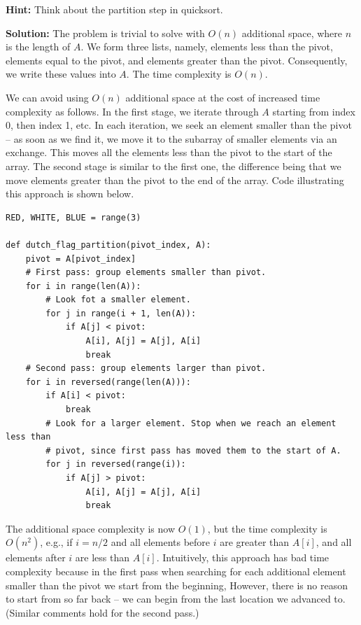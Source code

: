 \documentclass[11pt,a4paper]{article}
\begin{document}
\textbf{Hint:} Think about the partition step in quicksort.

\textbf{Solution:} The problem is trivial to solve with $O(n)$ additional
space, where $n$ is the length of $A$. We form three lists, namely, elements
less than the pivot, elements equal to the pivot, and elements greater than
the pivot. Consequently, we write these values into $A$. The time complexity
is $O(n)$.

We can avoid using $O(n)$ additional space at the cost of increased time
complexity as follows. In the first stage, we iterate through $A$ starting
from index 0, then index 1, etc. In each iteration, we seek an element smaller
than the pivot -- as soon as we find it, we move it to the subarray of smaller
elements via an exchange. This moves all the elements less than the pivot to
the start of the array. The second stage is similar to the first one, the
difference being that we move elements greater than the pivot to the end of
the array. Code illustrating this approach is shown below.

\begin{verbatim}
RED, WHITE, BLUE = range(3)

def dutch_flag_partition(pivot_index, A):
    pivot = A[pivot_index]
    # First pass: group elements smaller than pivot.
    for i in range(len(A)):
        # Look fot a smaller element.
        for j in range(i + 1, len(A)):
            if A[j] < pivot:
                A[i], A[j] = A[j], A[i]
                break
    # Second pass: group elements larger than pivot.
    for i in reversed(range(len(A))):
        if A[i] < pivot: 
            break
        # Look for a larger element. Stop when we reach an element less than 
        # pivot, since first pass has moved them to the start of A.
        for j in reversed(range(i)):
            if A[j] > pivot:
                A[i], A[j] = A[j], A[i]
                break
\end{verbatim}

The additional space complexity is now $O(1)$, but the time complexity is
$O(n^2)$, e.g., if $i = n/2$ and all elements before $i$ are greater than
$A[i]$, and all elements after $i$ are less than $A[i]$. Intuitively, this
approach has bad time complexity because in the first pass when searching for
each additional element smaller than the pivot we start from the beginning,
However, there is no reason to start from so far back -- we can begin from the
last location we advanced to. (Similar comments hold for the second pass.)
\end{document}
